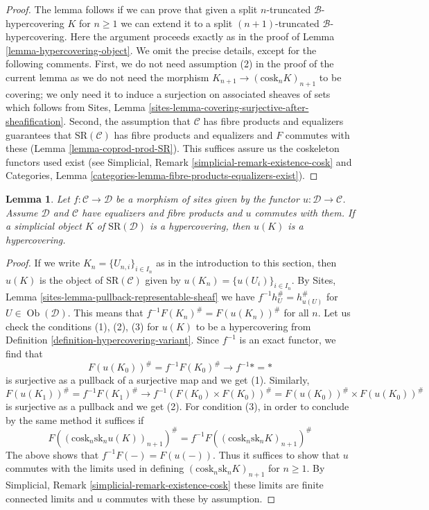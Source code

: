 \documentclass{stacks-project}
\theoremstyle{plain}
\newtheorem{lemma}[subsection]{Lemma}
\theoremstyle{definition}
\theoremstyle{remark}
\numberwithin{equation}{subsection}
\def\Ob{\mathop{\mathrm{Ob}}\nolimits}
\begin{document}
\begin{proof}
\medskip\noindent
The lemma follows if we can prove that given a split
$n$-truncated $\mathcal{B}$-hypercovering $K$ for $n \geq 1$
we can extend it to a split $(n + 1)$-truncated $\mathcal{B}$-hypercovering.
Here the argument proceeds exactly as in the proof of
Lemma \ref{lemma-hypercovering-object}.
We omit the precise details, except for the following comments.
First, we do not need assumption (2) in the proof of the current
lemma as we do not need the morphism
$K_{n + 1} \to (\text{cosk}_n K)_{n + 1}$ to be covering;
we only need it to induce a surjection on associated sheaves of sets
which follows from
Sites, Lemma \ref{sites-lemma-covering-surjective-after-sheafification}.
Second, the assumption that $\mathcal{C}$ has fibre products and equalizers
guarantees that $\text{SR}(\mathcal{C})$ has fibre products
and equalizers and $F$ commutes with these
(Lemma \ref{lemma-coprod-prod-SR}). This suffices
assure us the coskeleton functors used exist (see
Simplicial, Remark \ref{simplicial-remark-existence-cosk} and
Categories, Lemma \ref{categories-lemma-fibre-products-equalizers-exist}).
\end{proof}

\begin{lemma}
\label{lemma-hypercovering-morphism-sites}
Let $f : \mathcal{C} \to \mathcal{D}$ be a morphism of sites
given by the functor $u : \mathcal{D} \to \mathcal{C}$.
Assume $\mathcal{D}$ and $\mathcal{C}$ have equalizers and
fibre products and $u$ commutes with them.
If a simplicial object $K$ of $\text{SR}(\mathcal{D})$
is a hypercovering, then $u(K)$ is a hypercovering.
\end{lemma}

\begin{proof}
If we write $K_n = \{U_{n, i}\}_{i \in I_n}$ as in the introduction
to this section, then $u(K)$ is the object of $\text{SR}(\mathcal{C})$
given by $u(K_n) = \{u(U_i)\}_{i \in I_n}$.
By Sites, Lemma \ref{sites-lemma-pullback-representable-sheaf}
we have $f^{-1}h_U^\# = h_{u(U)}^\#$ for $U \in \Ob(\mathcal{D})$.
This means that $f^{-1}F(K_n)^\# = F(u(K_n))^\#$ for all $n$.
Let us check the conditions (1), (2), (3) for $u(K)$ to be a
hypercovering from Definition \ref{definition-hypercovering-variant}.
Since $f^{-1}$ is an exact functor, we find that
$$
F(u(K_0))^\# = f^{-1}F(K_0)^\# \to f^{-1}* = *
$$
is surjective as a pullback of a surjective map and we get (1).
Similarly,
$$
F(u(K_1))^\# = f^{-1}F(K_1)^\# \to
f^{-1} (F(K_0) \times F(K_0))^\# = F(u(K_0))^\# \times F(u(K_0))^\#
$$
is surjective as a pullback and we get (2). For condition (3),
in order to conclude by the same method it suffices if
$$
F((\text{cosk}_n \text{sk}_n u(K))_{n + 1})^\# =
f^{-1}F((\text{cosk}_n \text{sk}_n K)_{n + 1})^\#
$$
The above shows that $f^{-1}F(-) = F(u(-))$. Thus it suffices to show
that $u$ commutes with the limits used in defining
$(\text{cosk}_n \text{sk}_n K)_{n + 1}$ for $n \geq 1$.
By Simplicial, Remark \ref{simplicial-remark-existence-cosk}
these limits are finite connected limits and $u$ commutes with these
by assumption.
\end{proof}
\end{document}
